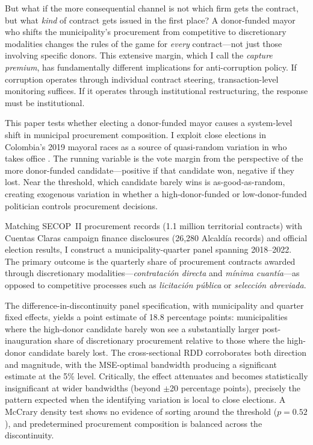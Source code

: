 \documentclass[12pt]{article}
\begin{document}
But what if the more consequential channel is not which firm gets the contract, but what \textit{kind} of contract gets issued in the first place? A donor-funded mayor who shifts the municipality's procurement from competitive to discretionary modalities changes the rules of the game for \textit{every} contract---not just those involving specific donors. This extensive margin, which I call the \textit{capture premium}, has fundamentally different implications for anti-corruption policy. If corruption operates through individual contract steering, transaction-level monitoring suffices. If it operates through institutional restructuring, the response must be institutional.

This paper tests whether electing a donor-funded mayor causes a system-level shift in municipal procurement composition. I exploit close elections in Colombia's 2019 mayoral races as a source of quasi-random variation in who takes office \citep{lee2008randomized}. The running variable is the vote margin from the perspective of the more donor-funded candidate---positive if that candidate won, negative if they lost. Near the threshold, which candidate barely wins is as-good-as-random, creating exogenous variation in whether a high-donor-funded or low-donor-funded politician controls procurement decisions.

Matching SECOP~II procurement records (1.1 million territorial contracts) with Cuentas Claras campaign finance disclosures (26,280 Alcald\'{i}a records) and official election results, I construct a municipality-quarter panel spanning 2018--2022. The primary outcome is the quarterly share of procurement contracts awarded through discretionary modalities---\textit{contrataci\'{o}n directa} and \textit{m\'{i}nima cuant\'{i}a}---as opposed to competitive processes such as \textit{licitaci\'{o}n p\'{u}blica} or \textit{selecci\'{o}n abreviada}.

The difference-in-discontinuity panel specification, with municipality and quarter fixed effects, yields a point estimate of 18.8 percentage points: municipalities where the high-donor candidate barely won see a substantially larger post-inauguration share of discretionary procurement relative to those where the high-donor candidate barely lost. The cross-sectional RDD corroborates both direction and magnitude, with the MSE-optimal bandwidth producing a significant estimate at the 5\% level. Critically, the effect attenuates and becomes statistically insignificant at wider bandwidths (beyond $\pm$20 percentage points), precisely the pattern expected when the identifying variation is local to close elections. A McCrary density test shows no evidence of sorting around the threshold ($p = 0.52$), and predetermined procurement composition is balanced across the discontinuity.
\end{document}
